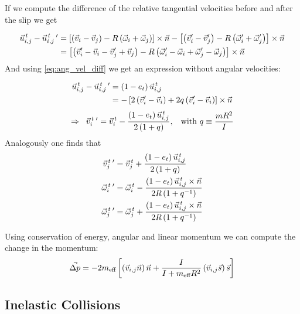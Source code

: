 If we compute the difference of the relative tangential velocities before and after the slip we get

\begin{align*}
\vec{u}_{i,j}^{\,t}-\vec{u}_{i,j}^{\,t}\,' 
&=
\left[\left(\vec{v}_{i}-\vec{v}_{j}\right) - R\left(\vec{\omega}_{i}+\vec{\omega}_{j}\right)\right]\times\vec{n}
-
\left[\left(\vec{v}_{i}'-\vec{v}_{j}'\right) - R\left(\vec{\omega}_{i}'+\vec{\omega}_{j}'\right)\right]\times\vec{n}\\
&=
\left[\left(\vec{v}_{i}'-\vec{v}_{i}-\vec{v}_{j}'+\vec{v}_{j}\right) - R\left(\vec{\omega}_{i}'-\vec{\omega}_{i} + \vec{\omega}_{j}'-\vec{\omega}_{j}  \right)\right]\times\vec{n}\\
\end{align*}
And using \eqref{eq:ang_vel_diff} we get an expression without angular velocities:

\begin{align*}
\vec{u}_{i,j}^{\,t}-\vec{u}_{i,j}^{\,t}\,' 
&=
\left(1-e_t\right)\vec{u}_{i,j}^{\,t} \\
&=-\left[2\left(\vec{v}_{i}'-\vec{v}_{i}\right) + 2q \left(\vec{v}_{i}'-\vec{v}_{i}\right) \right]\times\vec{n}
\end{align*}
\vspace{-0.5cm}
\begin{equation}
\Rightarrow
\hspace{0.2cm} 
\vec{v}_{i}^{\,t}\,' = \vec{v}_{i}^{\,t} - \frac{\left(1-e_t\right) \vec{u}_{i,j}^{\,t} }{2\left(1+q\right)}, 
\hspace{0.3cm}
\text{with }
q\equiv\frac{mR^2}{I}
\end{equation}
Analogously one finds that
\begin{align}
\vec{v}_{j}^{\,t}\,' &= \vec{v}_{j}^{\,t} + \frac{\left(1-e_t\right) \vec{u}_{i,j}^{\,t} }{2\left(1+q\right)} \\
\vec{\omega}_{i}^{\,t}\,' &= \vec{\omega}_{i}^{\,t} - \frac{\left(1-e_t\right) \vec{u}_{i,j}^{\,t}\times\vec{n} }{2R\left(1+q^{-1} \right)} \\
\vec{\omega}_{j}^{\,t}\,' &= \vec{\omega}_{j}^{\,t} + \frac{\left(1-e_t\right) \vec{u}_{i,j}^{\,t}\times\vec{n} }{2R\left(1+q^{-1} \right)} 
\end{align}

Using conservation of energy, angular and linear momentum we can compute the change in the momentum:
\begin{equation}
\vec{\Delta p} = - 2 m_{\text{eff}} \left[ \left(\vec{v}_{i,j} \vec{n} \right)\vec{n} + \frac{I}{I+m_{\text{eff}}R^2}  \left(\vec{v}_{i,j} \vec{s} \right)\vec{s}  \right]
\end{equation}

\subsection{Inelastic Collisions}



